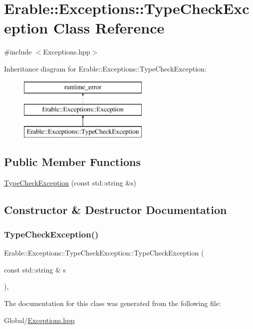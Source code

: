 \hypertarget{class_erable_1_1_exceptions_1_1_type_check_exception}{}\section{Erable\+::Exceptions\+::Type\+Check\+Exception Class Reference}
\label{class_erable_1_1_exceptions_1_1_type_check_exception}


{\ttfamily \#include $<$Exceptions.\+hpp$>$}

Inheritance diagram for Erable\+::Exceptions\+::Type\+Check\+Exception\+:\begin{figure}[H]
\begin{center}
\leavevmode
\includegraphics[height=3.000000cm]{class_erable_1_1_exceptions_1_1_type_check_exception}
\end{center}
\end{figure}
\subsection*{Public Member Functions}
\begin{DoxyCompactItemize}
\item 
\mbox{\hyperlink{class_erable_1_1_exceptions_1_1_type_check_exception_a70e175531b408631aa6f9a859439475f}{Type\+Check\+Exception}} (const std\+::string \&s)
\end{DoxyCompactItemize}


\subsection{Constructor \& Destructor Documentation}
\mbox{\label{class_erable_1_1_exceptions_1_1_type_check_exception_a70e175531b408631aa6f9a859439475f}} 
\subsubsection{\texorpdfstring{TypeCheckException()}{TypeCheckException()}}
{\footnotesize\ttfamily Erable\+::\+Exceptions\+::\+Type\+Check\+Exception\+::\+Type\+Check\+Exception (\begin{DoxyParamCaption}\item[{const std\+::string \&}]{s }\end{DoxyParamCaption})\hspace{0.3cm}{\ttfamily [inline]}, {\ttfamily [explicit]}}



The documentation for this class was generated from the following file\+:\begin{DoxyCompactItemize}
\item 
Global/\mbox{\hyperlink{_exceptions_8hpp}{Exceptions.\+hpp}}\end{DoxyCompactItemize}
